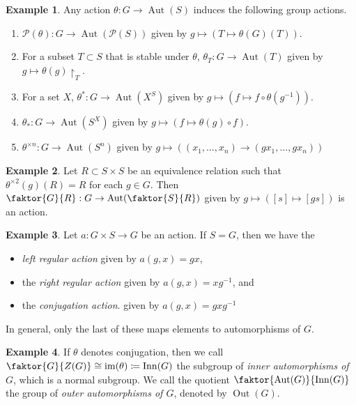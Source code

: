\documentclass[10pt,letterpaper,cm]{nupset}
\theoremstyle{definition}
\newtheorem{exmp}{Example}
\newcommand{\1}{\mathbf{1}}
\newcommand{\0}{\vec 0}
\DeclareMathOperator{\aut}{Aut}
\DeclareMathOperator{\inn}{Inn}
\DeclareMathOperator{\out}{Out}
\DeclareMathOperator{\im}{im}
\begin{document}
\theoremstyle{exmp}
\begin{exmp}{Any action $\theta : G \to \aut(S)$ induces the following group actions.}


\begin{enumerate}
\item $\mathcal{P}(\theta) : G \to \aut(\mathcal{P}(S))$ given by $g \mapsto (T \mapsto \theta(G)(T))$.
\item For a subset $T \subset S$ that is stable under $\theta$, $\theta_T : G \to \aut(T)$ given by $g \mapsto \theta(g)\restriction_T$.
\item For a set $X$, $\theta^\ast : G \to \aut(X^S)$ given by $g \mapsto (f \mapsto f \circ \theta(g^{-1}))$.
\item $\theta_{\ast}: G \to \aut(S^X)$ given by $g\mapsto (f \mapsto \theta(g) \circ f)$.
\item $\theta^{\times n} : G \to \aut(S^n)$ given by $g \mapsto ((x_1, \ldots, x_n) \to (gx_1, \ldots, gx_n))$

\end{enumerate}

\end{exmp}

\begin{exmp}
Let $R\subset S \times S$ be an equivalence relation such that $\theta^{\times 2}(g)(R) = R$ for each $g 
\in G$. Then $\faktor{G}{R}: G \to \aut(\faktor{S}{R})$ given by $g \mapsto ([s] \mapsto [gs])$ is an action.
\end{exmp}

\begin{exmp}
Let $a : G \times S \to G$ be an action. If $S = G$, then we have the 
\begin{itemize}
\item \textit{left regular action} given by $a(g, x) = gx$, 
\item the \textit{right regular action} given by $a(g, x) = xg^{-1}$, and 
\item the \textit{conjugation action}. given by $a(g, x) = gx g^{-1}$
\end{itemize}
In general, only the last of these maps elements to automorphisms of $G$.
\end{exmp}

\begin{exmp}
If $\theta$ denotes conjugation, then we call $\faktor{G}{Z(G)} \cong \im(\theta)\coloneqq  \inn(G)$ the subgroup of \textit{inner automorphisms of $G$}, which is a normal subgroup. We call the quotient $\faktor{\aut(G)}{\inn(G)}$ the group of \textit{outer automorphisms of $G$}, denoted by $\out(G)$.
\end{exmp}
\end{document}
